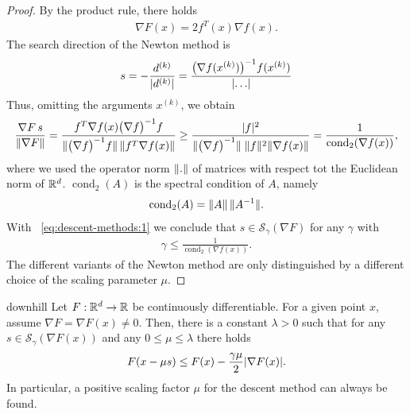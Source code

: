 \begin{proof}
  By the product rule, there holds
  \begin{gather*}
    \nabla F(x) = 2 f^T(x) \nabla f(x).
  \end{gather*}
  The search direction of the Newton method is
  \begin{gather*}
    s = -\frac{d^{(k)}}{\lvert d^{(k)}\rvert}
    = \frac{\bigl(\nabla f(x^{(k)})\bigr)^{-1}f(x^{(k)})}{\lvert\dots\rvert}
  \end{gather*}
  Thus, omitting the arguments $x^{(k)}$, we obtain
  \begin{gather*}
    \frac{\nabla F\, s}{\norm{\nabla F}}
    = \frac{f^T \nabla f(x)\bigl(\nabla f\bigr)^{-1} f}%
    {\norm{\bigl(\nabla f\bigr)^{-1} f}\,\norm{f^T \nabla f(x)}}
    \ge \frac{\abs{f}^2}{\norm{\bigl(\nabla f\bigr)^{-1}}\;
      \norm{f}^2 \norm{\nabla f(x)} }
    = \frac1{\operatorname{cond}_2 (\nabla f(x))},
  \end{gather*}
  where we used the operator norm $\lVert.\rVert$ of matrices with respect
  tot the Euclidean norm of $\mathbb R^d$. $\operatorname{cond}_2(A)$ is the
  spectral condition of $A$, namely
  \begin{gather*}
    \operatorname{cond}_2(A) = \lVert A\rVert \, \lVert A^{-1}\rVert.
  \end{gather*}
  With ~\ref{eq:descent-methods:1} we conclude that $s\in \mathcal S_\gamma(\nabla F)$ for any
  $\gamma$ with
  \begin{gather*}
    \gamma \le \frac1{\operatorname{cond}_2 (\nabla f(x))}.
  \end{gather*}
  The different variants of the Newton method are only distinguished by
  a different choice of the scaling parameter $\mu$.
\end{proof}

\begin{Lemma}{downhill}
  Let $F: \mathbb R^d \to \mathbb R$ be continuously differentiable. For a given
  point $x$, assume $\nabla F = \nabla F(x) \neq 0$.  Then, there is a
  constant $\lambda > 0$ such that for any
  $s\in \mathcal S_\gamma(\nabla F(x))$ and any
  $0 \le \mu \le \lambda$ there holds
  \begin{gather}
    \label{eq:downhill:1}
    F(x-\mu s) \le F(x) - \frac{\gamma\mu}2 \lvert\nabla F(x)\rvert.
  \end{gather}
  In particular, a positive scaling factor $\mu$ for the descent method can
  always be found.
\end{Lemma}

